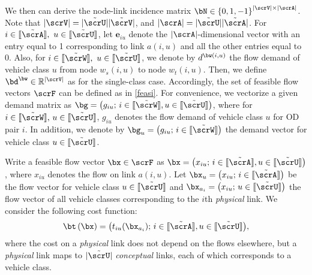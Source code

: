 \documentclass[3p]{elsarticle}
\begin{document}
	
We then can derive the node-link incidence matrix $\bN \in {\left\{
    {0,1, - 1} \right\}^{\left| \scrV \right| \times \left| \scrA
    \right|}}$. Note that $\left| \scrV \right| =
|\tilde\scrU||\tilde\scrV|$, and $\left| \scrA \right| =
|\tilde\scrU||\tilde\scrA|$. For $i \in [\kern-0.15em[ \tilde\scrA
]\kern-0.15em],~ u \in [\kern-0.15em[ \tilde\scrU ]\kern-0.15em]$, let
$\textbf{e}_{iu}$ denote the $\left| \scrA \right|$-dimensional vector
with an entry equal to 1 corresponding to link $a(i,u)$ and all the
other entries equal to 0.  Also, for $i \in [\kern-0.15em[ \tilde\scrW
]\kern-0.15em],~ u \in [\kern-0.15em[ \tilde\scrU ]\kern-0.15em]$, we
denote by ${d^{\bw(i,u)}}$ the flow demand of vehicle class $u$ from
node ${w_s(i,u)}$ to node ${w_t(i,u)}$. Then, we define ${\bd^{\bw}} \in
{\mathbb{R}^{\left| \scrV \right|}}$ as for the single-class case.
Accordingly, the set of feasible flow vectors $\scrF$ can be defined as
in \eqref{feasi}.  For convenience, we vectorize a given demand matrix
as $\bg = \big( {{g_{iu}}; \,i \in [\kern-0.15em[ \tilde \scrW
  ]\kern-0.15em],u \in [\kern-0.15em[ \tilde \scrU ]\kern-0.15em]}
\big)$, where for $i \in [\kern-0.15em[ \tilde \scrW ]\kern-0.15em],\,u
\in [\kern-0.15em[ \tilde \scrU ]\kern-0.15em]$, $g_{iu}$ denotes the
flow demand of vehicle class $u$ for OD pair $i$. In addition, we denote
by $\bg_u = \big( {{g_{iu}}; \,i \in [\kern-0.15em[ \tilde \scrW
  ]\kern-0.15em]} \big)$ the demand vector for vehicle class $u \in
[\kern-0.15em[ \tilde \scrU ]\kern-0.15em]$.
	
	
Write a feasible flow vector $\bx \in \scrF$ as $\bx = \big( {x_{iu};
  \,i \in [\kern-0.15em[ \tilde\scrA ]\kern-0.15em], u \in
  [\kern-0.15em[ \tilde\scrU ]\kern-0.15em]} \big)$, where $x_{iu}$
denotes the flow on link $a(i,u)$. Let $\bx_u = \big( {{x_{iu}}; \,i \in
  [\kern-0.15em[ \tilde \scrA ]\kern-0.15em]} \big)$ be the flow vector
for vehicle class $u \in [\kern-0.15em[ \tilde \scrU ]\kern-0.15em]$ and
${\bx_{a_i}} = \big( {x_{iu}};\, u \in [\kern-0.15em[ \tilde\scrU
]\kern-0.15em]\big)$ the flow vector of all vehicle classes
corresponding to the $i$th \emph{physical} link.  We consider the
following cost function:
\begin{align}
	\bt\left( \bx \right) = \big({t_{iu}}(\bx_{a_i}); \,i \in [\kern-0.15em[ \tilde\scrA 
	]\kern-0.15em], u \in [\kern-0.15em[ \tilde\scrU 
	]\kern-0.15em]\big), \label{costf} 
\end{align}
where the cost on a \emph{physical} link does not depend on the flows
elsewhere, but a \emph{physical} link maps to $|\tilde{\scrU}|$
\emph{conceptual} links, each of which corresponds to a vehicle class.
	
\end{document}
